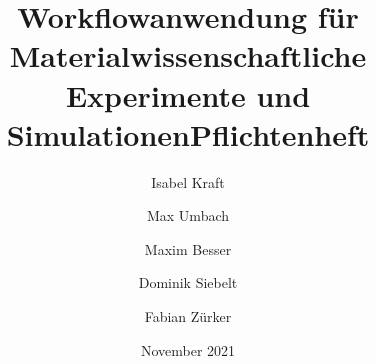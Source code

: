 \documentclass[paper=a4, fontsize = 12pt, DIV = calc, twoside=off, parskip=full, numbers=noenddot]{scrbook}
\title{Workflowanwendung für Materialwissenschaftliche Experimente und Simulationen}
\title {Pflichtenheft}
\author{Isabel Kraft \and Max Umbach 
        \and Maxim Besser \and Dominik Siebelt \and Fabian Zürker}
\date{November 2021}
\begin{document}
\maketitle

\newpage
\tableofcontents
\newpage














\printglossary
\end{document}
